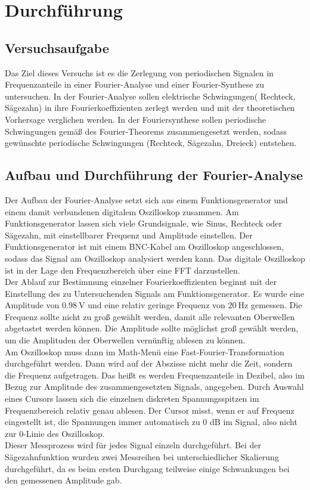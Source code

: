 \section{Durchführung}
\label{sec:Durchführung}
\subsection{Versuchsaufgabe}
Das Ziel dieses Versuchs ist es die Zerlegung von periodischen
Signalen in Frequenzanteile in einer Fourier-Analyse und einer Fourier-Synthese zu untersuchen.
In der Fourier-Analyse sollen elektrische Schwingungen( Rechteck, Sägezahn) in ihre Fourierkoeffizienten
zerlegt werden und mit der theoretischen Vorhersage verglichen werden.
In der Fouriersynthese sollen periodische Schwingungen gemäß des Fourier-Theorems
zusammengesetzt werden, sodass gewünschte periodische Schwingungen (Rechteck, Sägezahn, Dreieck) entstehen.
\subsection{Aufbau und Durchführung der Fourier-Analyse}
Der Aufbau der Fourier-Analyse setzt sich aus einem Funktionsgenerator und
einem damit verbundenen digitalem Oszilloskop zusammen. Am Funktionsgenerator lassen sich
viele Grundsignale, wie Sinus, Rechteck oder Sägezahn, mit einstellbarer Frequenz und
Amplitude einstellen. Der Funktionsgenerator ist mit einem BNC-Kabel am Oszilloskop angeschlossen, sodass das Signal
am Oszilloskop analysiert werden kann. Das digitale Oszilloskop ist in der Lage den Frequenzbereich über eine FFT
darzustellen.\\
\noindent Der Ablauf zur Bestimmung einzelner Fourierkoeffizienten beginnt mit der Einstellung des zu Untersuchenden Signals am
Funktionsgenerator. Es wurde eine Amplitude von $\qty{0.98}{\volt}$ und eine relativ
geringe Frequenz von $\qty{20}{\Hz}$ gemessen. Die Frequenz sollte nicht zu groß gewählt werden,
damit alle relevanten Oberwellen abgetastet werden können. Die Amplitude sollte möglichst groß
gewählt werden, um die Amplituden der Oberwellen vernünftig ablesen zu können.\\
\noindent Am Oszilloskop muss
dann im Math-Menü eine Fast-Fourier-Transformation durchgeführt werden. Dann wird auf der Abszisse nicht mehr die Zeit,
sondern die Frequenz aufgetragen. Das heißt es werden Frequenzanteile in Dezibel, also im Bezug zur Amplitude des zusammengesetzten Signals,
angegeben. Durch Auswahl eines Cursors lassen sich die einzelnen diskreten Spannungsspitzen im Frequenzbereich
relativ genau ablesen. Der Cursor misst, wenn er auf Frequenz eingestellt ist, die Spannungen immer automatisch zu 0 dB im Signal, also
nicht zur 0-Linie des Oszilloskop.\\
\noindent Dieser Messprozess wird für jedes Signal einzeln durchgeführt. Bei der
Sägezahnfunktion wurden zwei Messreihen bei unterschiedlicher Skalierung durchgeführt,
da es beim ersten Durchgang teilweise einige Schwankungen bei den gemessenen Amplitude gab.
